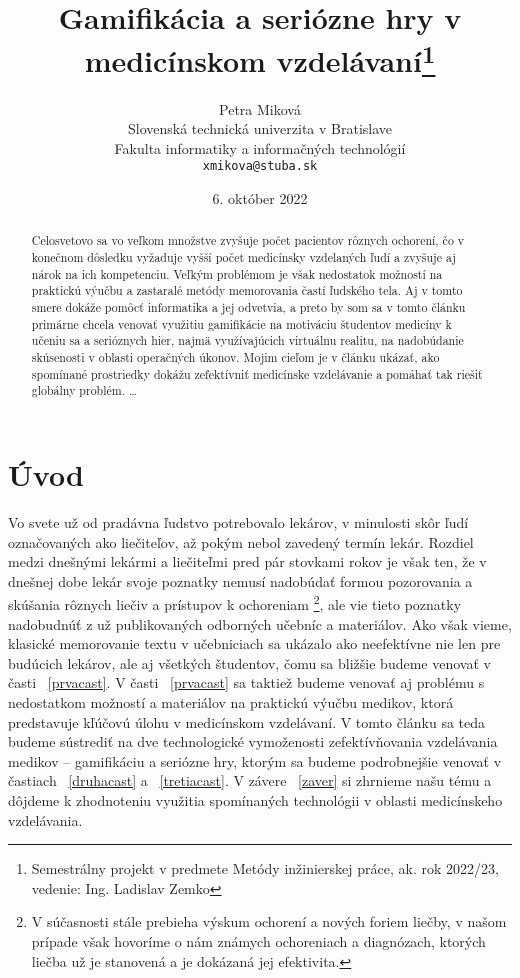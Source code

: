 \documentclass[10pt,twoside,slovak,a4paper]{article}
\title{Gamifikácia a seriózne hry v medicínskom vzdelávaní\thanks{Semestrálny projekt v predmete Metódy inžinierskej práce, ak. rok 2022/23, vedenie: Ing. Ladislav Zemko}} %
\author{Petra Miková\\[2pt]
	{\small Slovenská technická univerzita v Bratislave}\\
	{\small Fakulta informatiky a informačných technológií}\\
	{\small \texttt{xmikova@stuba.sk}}
	}
\date{\small 6. október 2022} %
\begin{document}
\maketitle

\begin{abstract}
Celosvetovo sa vo veľkom množstve zvyšuje počet pacientov rôznych ochorení, čo v konečnom dôsledku vyžaduje vyšší počet medicínsky vzdelaných ľudí a zvyšuje aj nárok na ich kompetenciu. Veľkým problémom je však nedostatok možností na praktickú výučbu a zastaralé metódy memorovania častí ľudského tela. Aj v tomto smere dokáže pomôcť informatika a jej odvetvia, a preto by som sa v tomto článku primárne chcela venovať využitiu gamifikácie na motiváciu študentov medicíny k učeniu sa a serióznych hier, najmä využívajúcich virtuálnu realitu, na nadobúdanie skúsenosti v oblasti operačných úkonov. Mojim cieľom je v článku ukázať, ako spomínané prostriedky dokážu zefektívniť medicínske vzdelávanie a pomáhať tak riešiť globálny problém.
\ldots
\end{abstract}



\section{Úvod}

Vo svete už od pradávna ľudstvo potrebovalo lekárov, v minulosti skôr ľudí označovaných ako liečiteľov, až pokým nebol zavedený termín lekár. Rozdiel medzi dnešnými lekármi a liečiteľmi pred pár stovkami rokov je však ten, že v dnešnej dobe lekár svoje poznatky nemusí nadobúdať formou pozorovania a skúšania rôznych liečiv a prístupov k ochoreniam \footnote{V súčasnosti stále prebieha výskum ochorení a nových foriem liečby, v našom prípade však hovoríme o nám známych ochoreniach a diagnózach, ktorých liečba už je stanovená a je dokázaná jej efektivita.}, ale vie tieto poznatky nadobudnúť z už publikovaných odborných učebníc a materiálov. Ako však vieme, klasické memorovanie textu v učebniciach sa ukázalo ako neefektívne \cite{Klemm2007WhatGI} nie len pre budúcich lekárov, ale aj všetkých študentov, čomu sa bližšie budeme venovať v časti ~\ref{prvacast}. V časti ~\ref{prvacast} sa taktiež budeme venovať aj problému s nedostatkom možností a materiálov na praktickú výučbu medikov, ktorá predstavuje kľúčovú úlohu v medicínskom vzdelávaní. V tomto článku sa teda budeme sústrediť na dve technologické vymoženosti zefektívňovania vzdelávania medikov – gamifikáciu a seriózne hry, ktorým sa budeme podrobnejšie venovať v častiach ~\ref{druhacast} a ~\ref{tretiacast}. V závere ~\ref{zaver} si zhrnieme našu tému a dôjdeme k zhodnoteniu využitia spomínaných technológii v oblasti medicínskeho vzdelávania.
\end{document}
